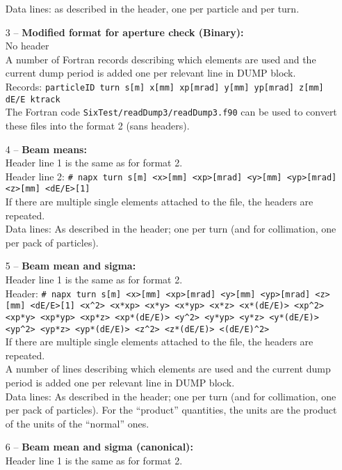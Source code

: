 \documentclass[a4paper,11pt]{report}
\begin{document}
\begin{enumerate}
	Data lines: as described in the header, one per particle and per turn.
        \item[3] -- \textbf{Modified format for aperture check (Binary):}\\
        No header\\
        A number of Fortran records describing which elements are used and the current dump period is added one per relevant line in DUMP block.\\
        Records: \texttt{particleID turn s[m] x[mm] xp[mrad] y[mm] yp[mrad] z[mm] dE/E ktrack}\\
        The Fortran code \texttt{SixTest/readDump3/readDump3.f90} can be used to convert these files into the format 2 (sans headers).
	\item[4] -- \textbf{Beam means:}\\
        Header line 1 is the same as for format 2.\\
        Header line 2: \texttt{\# napx turn s[m] <x>[mm] <xp>[mrad] <y>[mm] <yp>[mrad] <z>[mm] <dE/E>[1]}\\
        If there are multiple single elements attached to the file, the headers are repeated.\\
        Data lines: As described in the header; one per turn (and for collimation, one per pack of particles).
	\item[5] -- \textbf{Beam mean and sigma:}\\
        Header line 1 is the same as for format 2.\\
	Header: \texttt{\# napx turn s[m] <x>[mm] <xp>[mrad] <y>[mm] <yp>[mrad] <z>[mm] <dE/E>[1] <x\^{}2> <x*xp> <x*y> <x*yp> <x*z> <x*(dE/E)> <xp\^{}2> <xp*y> <xp*yp> <xp*z> <xp*(dE/E)> <y\^{}2> <y*yp> <y*z> <y*(dE/E)> <yp\^{}2> <yp*z> <yp*(dE/E)> <z\^{}2> <z*(dE/E)> <(dE/E)\^{}2>}\\
        If there are multiple single elements attached to the file, the headers are repeated.\\
	A number of lines describing which elements are used and the current dump period is added one per relevant line in DUMP block.\\
	Data lines: As described in the header; one per turn (and for collimation, one per pack of particles).
        For the ``product'' quantities, the units are the product of the units of the ``normal'' ones.
	\item[6] -- \textbf{Beam mean and sigma (canonical):}\\
        Header line 1 is the same as for format 2.\\

\end{enumerate}
\end{document}
